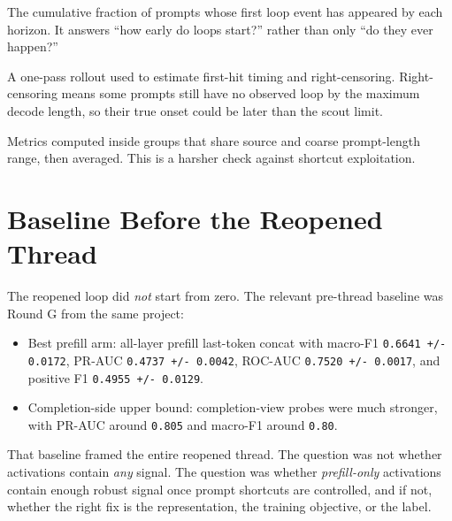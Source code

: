 \documentclass[11pt]{article}
\begin{document}
\begin{description}[style=nextline,leftmargin=1.8em]
  \item[Onset CDF] The cumulative fraction of prompts whose first loop event has appeared by each horizon. It answers ``how early do loops start?'' rather than only ``do they ever happen?''
  \item[Survival scout] A one-pass rollout used to estimate first-hit timing and right-censoring. Right-censoring means some prompts still have no observed loop by the maximum decode length, so their true onset could be later than the scout limit.
  \item[Within source$\times$length bins] Metrics computed inside groups that share source and coarse prompt-length range, then averaged. This is a harsher check against shortcut exploitation.
\end{description}

\section*{Baseline Before the Reopened Thread}
The reopened loop did \emph{not} start from zero. The relevant pre-thread baseline was Round G from the same project:
\begin{itemize}
  \item Best prefill arm: all-layer prefill last-token concat with macro-F1 \texttt{0.6641 +/- 0.0172}, PR-AUC \texttt{0.4737 +/- 0.0042}, ROC-AUC \texttt{0.7520 +/- 0.0017}, and positive F1 \texttt{0.4955 +/- 0.0129}.
  \item Completion-side upper bound: completion-view probes were much stronger, with PR-AUC around \texttt{0.805} and macro-F1 around \texttt{0.80}.
\end{itemize}

That baseline framed the entire reopened thread. The question was not whether activations contain \emph{any} signal. The question was whether \emph{prefill-only} activations contain enough robust signal once prompt shortcuts are controlled, and if not, whether the right fix is the representation, the training objective, or the label.
\end{document}
